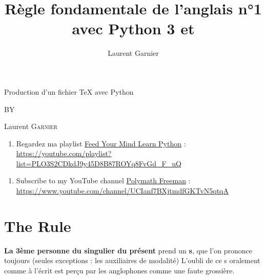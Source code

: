 \documentclass[12pt,4]{article}
\author{Laurent Garnier}
\date{}
\title{Règle fondamentale de l'anglais n°1 avec Python 3 et \XeLaTeX}
\begin{document}
\begin{titlepage}

\begin{center}

{\Large {\sc Production d'un fichier TeX avec Python }}
\vspace{1cm}

\end{center}
\newpage

\vspace{2cm}

\begin{center}

BY

{\Large Laurent \textsc{Garnier} \par}

\vspace{2cm}

\end{center}
\begin{enumerate}
\end{enumerate}
\newpage

\begin{center}
\begin{enumerate}
\item {\sc Regardez ma playlist \href{https://youtube.com/playlist?list=PLO3S2CDkdJ9y45D8B87ROYq8FvGd_F_uQ}{Feed Your Mind Learn Python} : \url{https://youtube.com/playlist?list=PLO3S2CDkdJ9y45D8B87ROYq8FvGd_F_uQ}}\par
\end{enumerate}
\begin{enumerate}
\item {\sc Subscribe to my YouTube channel} \href{https://www.youtube.com/channel/UCIanf7BXjtmdfGKTvN5qtqA}{Polymath Freeman} : \url{https://www.youtube.com/channel/UCIanf7BXjtmdfGKTvN5qtqA}
\end{enumerate}

\end{center}

\end{titlepage}

\tableofcontents

\clearpage
{}
\renewcommand{\headrulewidth}{.2pt}
\renewcommand{\footrulewidth}{.4pt}
\section{The Rule}
\label{sec:org11a7b5a}
\textbf{La 3ème personne du singulier du présent} prend un \textbf{s}, que l'on  prononce toujours (seules exceptions : les auxiliaires de modalité)
L'oubli de ce s oralement comme à l'écrit est perçu par les anglophones comme une faute grossière.
\end{document}
